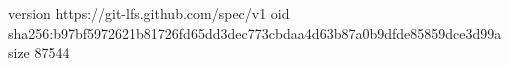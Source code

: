 version https://git-lfs.github.com/spec/v1
oid sha256:b97bf5972621b81726fd65dd3dec773cbdaa4d63b87a0b9dfde85859dce3d99a
size 87544
